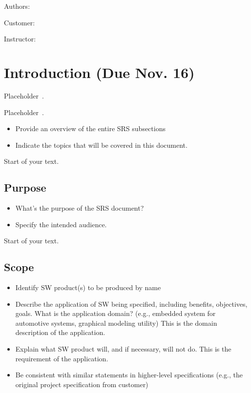 \documentclass[12pt]{article}
\begin{document}
Authors:

Customer:

Instructor:

\section{{}{Introduction (Due Nov. 16)}}\label{introduction-due-nov.-16}

Placeholder~\cite{alaettinoglurfc}.

Placeholder~\cite{blunk2005rfc}.

\begin{itemize}
\item
  Provide an overview of the entire SRS subsections
\item
  Indicate the topics that will be covered in this document.
\end{itemize}

Start of your text.

\subsection{Purpose}\label{purpose}

\begin{itemize}
\item
  What's the purpose of the SRS document?
\item
  Specify the intended audience.
\end{itemize}

Start of your text.

\subsection{Scope}\label{scope}

\begin{itemize}
\item
  Identify SW product(s) to be produced by name
\item
  Describe the application of SW being specified, including benefits,
  objectives, goals. What is the application domain? (e.g., embedded
  system for automotive systems, graphical modeling utility) This is the
  domain description of the application.
\item
  Explain what SW product will, and if necessary, will not do. This is
  the requirement of the application.
\item
  Be consistent with similar statements in higher-level specifications
  (e.g., the original project specification from customer)
\end{itemize}
\end{document}
